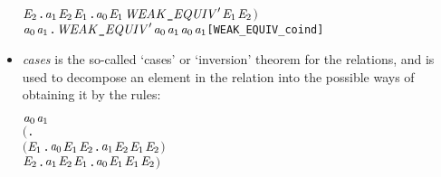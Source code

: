 \begin{itemize}
\begin{alltt}
        \HOLSymConst{\HOLTokenForall{}}\ensuremath{\HOLBoundVar{E}\sb{\mathrm{2}}}. \ensuremath{\HOLBoundVar{a}\sb{\mathrm{1}}} \HOLTokenTransBegin\HOLSymConst{\ensuremath{\tau}}\HOLTokenTransEnd \ensuremath{\HOLBoundVar{E}\sb{\mathrm{2}}} \HOLSymConst{\HOLTokenImp{}} \HOLSymConst{\HOLTokenExists{}}\ensuremath{\HOLBoundVar{E}\sb{\mathrm{1}}}. \ensuremath{\HOLBoundVar{a}\sb{\mathrm{0}}} \HOLSymConst{\HOLTokenEPS} \ensuremath{\HOLBoundVar{E}\sb{\mathrm{1}}} \HOLSymConst{\HOLTokenConj{}} \ensuremath{\HOLFreeVar{WEAK\HOLTokenUnderscore{}EQUIV}\sp{\prime}} \ensuremath{\HOLBoundVar{E}\sb{\mathrm{1}}} \ensuremath{\HOLBoundVar{E}\sb{\mathrm{2}}}\ensuremath{)} \HOLSymConst{\HOLTokenImp{}}
   \HOLSymConst{\HOLTokenForall{}}\ensuremath{\HOLBoundVar{a}\sb{\mathrm{0}}} \ensuremath{\HOLBoundVar{a}\sb{\mathrm{1}}}. \ensuremath{\HOLFreeVar{WEAK\HOLTokenUnderscore{}EQUIV}\sp{\prime}} \ensuremath{\HOLBoundVar{a}\sb{\mathrm{0}}} \ensuremath{\HOLBoundVar{a}\sb{\mathrm{1}}} \HOLSymConst{\HOLTokenImp{}} \ensuremath{\HOLBoundVar{a}\sb{\mathrm{0}}} \HOLSymConst{\HOLTokenWeakEQ} \ensuremath{\HOLBoundVar{a}\sb{\mathrm{1}}}\hfill{[WEAK_EQUIV_coind]}
\end{alltt}
\item \emph{cases} is the so-called `cases' or `inversion' theorem for
  the relations, and is used to decompose an element in the relation into the possible ways of
  obtaining it by the rules:
\begin{alltt}
\HOLTokenTurnstile{} \ensuremath{\HOLFreeVar{a}\sb{\mathrm{0}}} \HOLSymConst{\HOLTokenWeakEQ} \ensuremath{\HOLFreeVar{a}\sb{\mathrm{1}}} \HOLSymConst{\HOLTokenEquiv{}}
   \ensuremath{(}\HOLSymConst{\HOLTokenForall{}}.
        \ensuremath{(}\HOLSymConst{\HOLTokenForall{}}\ensuremath{\HOLBoundVar{E}\sb{\mathrm{1}}}. \ensuremath{\HOLFreeVar{a}\sb{\mathrm{0}}} \HOLTokenTransBegin{} \HOLTokenTransEnd \ensuremath{\HOLBoundVar{E}\sb{\mathrm{1}}} \HOLSymConst{\HOLTokenImp{}} \HOLSymConst{\HOLTokenExists{}}\ensuremath{\HOLBoundVar{E}\sb{\mathrm{2}}}. \ensuremath{\HOLFreeVar{a}\sb{\mathrm{1}}} \HOLTokenWeakTransBegin{} \HOLTokenWeakTransEnd \ensuremath{\HOLBoundVar{E}\sb{\mathrm{2}}} \HOLSymConst{\HOLTokenConj{}} \ensuremath{\HOLBoundVar{E}\sb{\mathrm{1}}} \HOLSymConst{\HOLTokenWeakEQ} \ensuremath{\HOLBoundVar{E}\sb{\mathrm{2}}}\ensuremath{)} \HOLSymConst{\HOLTokenConj{}}
        \HOLSymConst{\HOLTokenForall{}}\ensuremath{\HOLBoundVar{E}\sb{\mathrm{2}}}. \ensuremath{\HOLFreeVar{a}\sb{\mathrm{1}}} \HOLTokenTransBegin{} \HOLTokenTransEnd \ensuremath{\HOLBoundVar{E}\sb{\mathrm{2}}} \HOLSymConst{\HOLTokenImp{}} \HOLSymConst{\HOLTokenExists{}}\ensuremath{\HOLBoundVar{E}\sb{\mathrm{1}}}. \ensuremath{\HOLFreeVar{a}\sb{\mathrm{0}}} \HOLTokenWeakTransBegin{} \HOLTokenWeakTransEnd \ensuremath{\HOLBoundVar{E}\sb{\mathrm{1}}} \HOLSymConst{\HOLTokenConj{}} \ensuremath{\HOLBoundVar{E}\sb{\mathrm{1}}} \HOLSymConst{\HOLTokenWeakEQ} \ensuremath{\HOLBoundVar{E}\sb{\mathrm{2}}}\ensuremath{)} \HOLSymConst{\HOLTokenConj{}}

\end{alltt}
\end{itemize}
